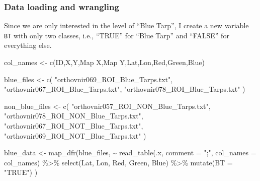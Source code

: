 \documentclass[
]{article}
\newenvironment{Shaded}{\begin{snugshade}}{\end{snugshade}}
\newcommand{\AttributeTok}[1]{\textcolor[rgb]{0.77,0.63,0.00}{#1}}
\newcommand{\FunctionTok}[1]{\textcolor[rgb]{0.00,0.00,0.00}{#1}}
\newcommand{\NormalTok}[1]{#1}
\newcommand{\OtherTok}[1]{\textcolor[rgb]{0.56,0.35,0.01}{#1}}
\newcommand{\SpecialCharTok}[1]{\textcolor[rgb]{0.00,0.00,0.00}{#1}}
\newcommand{\StringTok}[1]{\textcolor[rgb]{0.31,0.60,0.02}{#1}}
\begin{document}
\hypertarget{data-loading-and-wrangling}{%
\subsubsection{Data loading and
wrangling}\label{data-loading-and-wrangling}}

Since we are only interested in the level of ``Blue Tarp'', I create a
new variable \texttt{BT} with only two classes, i.e., ``TRUE'' for
``Blue Tarp'' and ``FALSE'' for everything else.

\begin{Shaded}
\begin{Highlighting}[]
\NormalTok{col\_names }\OtherTok{\textless{}{-}} \FunctionTok{c}\NormalTok{(}\StringTok{\textquotesingle{}ID\textquotesingle{}}\NormalTok{,}\StringTok{\textquotesingle{}X\textquotesingle{}}\NormalTok{,}\StringTok{\textquotesingle{}Y\textquotesingle{}}\NormalTok{,}\StringTok{\textquotesingle{}Map X\textquotesingle{}}\NormalTok{,}\StringTok{\textquotesingle{}Map Y\textquotesingle{}}\NormalTok{,}\StringTok{\textquotesingle{}Lat\textquotesingle{}}\NormalTok{,}\StringTok{\textquotesingle{}Lon\textquotesingle{}}\NormalTok{,}\StringTok{\textquotesingle{}Red\textquotesingle{}}\NormalTok{,}\StringTok{\textquotesingle{}Green\textquotesingle{}}\NormalTok{,}\StringTok{\textquotesingle{}Blue\textquotesingle{}}\NormalTok{)}

\NormalTok{blue\_files }\OtherTok{\textless{}{-}} \FunctionTok{c}\NormalTok{(}
  \StringTok{"orthovnir069\_ROI\_Blue\_Tarps.txt"}\NormalTok{,}
  \StringTok{"orthovnir067\_ROI\_Blue\_Tarps.txt"}\NormalTok{,}
  \StringTok{"orthovnir078\_ROI\_Blue\_Tarps.txt"}
\NormalTok{)}

\NormalTok{non\_blue\_files }\OtherTok{\textless{}{-}} \FunctionTok{c}\NormalTok{(}
  \StringTok{"orthovnir057\_ROI\_NON\_Blue\_Tarps.txt"}\NormalTok{,}
  \StringTok{"orthovnir078\_ROI\_NON\_Blue\_Tarps.txt"}\NormalTok{,}
  \StringTok{"orthovnir067\_ROI\_NOT\_Blue\_Tarps.txt"}\NormalTok{,}
  \StringTok{"orthovnir069\_ROI\_NOT\_Blue\_Tarps.txt"}
\NormalTok{)}

\NormalTok{blue\_data }\OtherTok{\textless{}{-}} \FunctionTok{map\_dfr}\NormalTok{(blue\_files, }\SpecialCharTok{\textasciitilde{}} 
  \FunctionTok{read\_table}\NormalTok{(.x, }\AttributeTok{comment =} \StringTok{";"}\NormalTok{, }\AttributeTok{col\_names =}\NormalTok{ col\_names) }\SpecialCharTok{\%\textgreater{}\%} 
    \FunctionTok{select}\NormalTok{(Lat, Lon, Red, Green, Blue) }\SpecialCharTok{\%\textgreater{}\%} 
    \FunctionTok{mutate}\NormalTok{(}\AttributeTok{BT =} \StringTok{"TRUE"}\NormalTok{)}
\NormalTok{)}


\end{Highlighting}
\end{Shaded}
\end{document}
